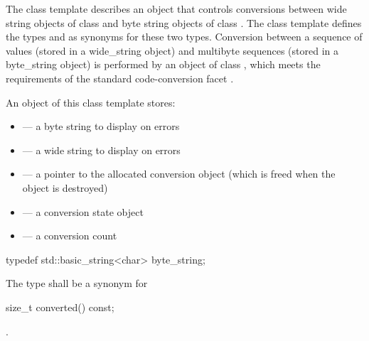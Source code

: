 \pnum
The class template describes an object that controls conversions between wide
string objects of class  and byte string objects of class . The class template defines the types
 and  as synonyms for these two types.
Conversion between a sequence of  values (stored in a wide_string
object) and multibyte sequences (stored in a byte_string object) is performed by
an object of class , which meets the
requirements of the standard code-conversion facet .

\pnum
An object of this class template stores:

\begin{itemize}
\item {} --- a byte string to display on errors
\item {} --- a wide string to display on errors
\item {} --- a pointer to the allocated conversion object
(which is freed when the  object is destroyed)
\item {} --- a conversion state object
\item {} --- a conversion count
\end{itemize}

%
%
\begin{itemdecl}
typedef std::basic_string<char> byte_string;
\end{itemdecl}

\begin{itemdescr}
\pnum
The type shall be a synonym for 
\end{itemdescr}

%
%
\begin{itemdecl}
size_t converted() const;
\end{itemdecl}

\begin{itemdescr}
\pnum
\returns {}.
\end{itemdescr}


